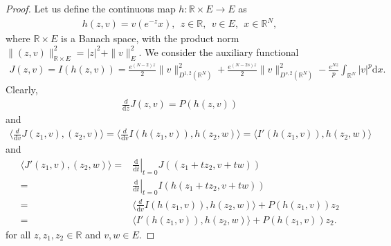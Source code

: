 \documentclass[12pt,a4paper,reqno]{amsart}
\numberwithin{equation}{section}
\begin{document}
\begin{proof}
Let us define the continuous map $h:\mathbb{R}\times E\to E$ as
\begin{equation*}
\begin{aligned}
h(z,v)=v(e^{-z}x),~~z\in\mathbb{R},~~v\in E,~~x\in\mathbb{R}^{N},
\end{aligned}
\end{equation*}
where $\mathbb{R}\times E$ is a Banach space, with the product norm $\|(z,v)\|_{\mathbb{R}\times E}^{2}=|z|^{2}+\|v\|_{E}^{2}$.
We consider the auxiliary functional
\begin{equation*}
\begin{aligned}
J(z,v)=I(h(z,v))=
\frac{e^{(N-2)z}}{2}
\|v\|^{2}_{D^{1,2}(\mathbb{R}^{N})}
+
\frac{e^{(N-2s)z}}{2}
\|v\|^{2}_{D^{s,2}(\mathbb{R}^{N})}
-\frac{e^{Nz}}{p}\int_{\mathbb{R}^{N}}|v|^{p}\mathrm{d}x.
\end{aligned}
\end{equation*}
Clearly,
\begin{equation*}
\begin{aligned}
\frac{d}{\mathrm{d}z}J(z,v)=P(h(z,v))
\end{aligned}
\end{equation*}
and
\begin{equation*}
\begin{aligned}
\langle\frac{d}{\mathrm{d}v}J(z_{1},v),(z_{2},v)\rangle
=
\langle\frac{d}{\mathrm{d}v}I(h(z_{1},v)),h(z_{2},w)\rangle
=
\langle I'(h(z_{1},v)),h(z_{2},w)\rangle
\end{aligned}
\end{equation*}
and
\begin{equation}\label{5.5}
\begin{aligned}
\langle J'(z_{1},v),(z_{2},w)\rangle
=&
\left.\frac{\mathrm{d}}{\mathrm{d}t}\right|_{t=0}J((z_{1}+tz_{2},v+tw))\\
=&
\left.\frac{\mathrm{d}}{\mathrm{d}t}\right|_{t=0}I(h(z_{1}+tz_{2},v+tw))\\
=&
\langle\frac{d}{\mathrm{d}v}I(h(z_{1},v)),h(z_{2},w)\rangle
+
P(h(z_{1},v))z_{2}\\
=&
\langle I'(h(z_{1},v)),h(z_{2},w)\rangle
+
P(h(z_{1},v))z_{2}.
\end{aligned}
\end{equation}
for all $z,z_{1},z_{2}\in \mathbb{R}$ and $v,w\in E$.


\end{proof}
\end{document}
